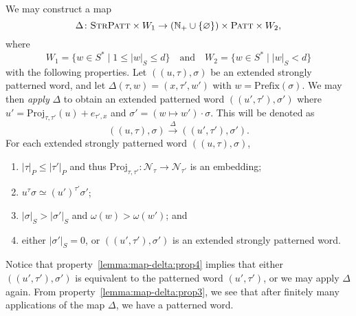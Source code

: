 \begin{lemma}\label{lemma:map-delta}
	We may construct a map
	\[
		\Delta \colon
		\textsc{StrPatt} \times W_1
		\to
		(\mathbb{N}_+ \cup \{\varnothing\}) \times \textsc{Patt} \times W_2,
	\]
	where
	\[
		W_1 = \{w \in S^* \mid 1 \leqslant |w|_S \leqslant d\}
		\quad\text{and}\quad
		W_2 = \{w \in S^* \mid |w|_S < d\}
	\]
	with the following properties.
	Let $((u,\tau),\sigma)$ be an extended strongly patterned word, and let $\Delta(\tau,w) = (x,\tau',w')$ with $w = \mathrm{Prefix}(\sigma)$.
	We may then \emph{apply} $\Delta$ to obtain an extended patterned word $((u',\tau'),\sigma')$ where $u' = \mathrm{Proj}_{\tau,\tau'}(u)+e_{\tau',x}$ and $\sigma' = (w\mapsto w') \cdot \sigma$.
	This will be denoted as
	\[
		((u,\tau),\sigma)
		\xrightarrow{\Delta}
		((u',\tau'),\sigma').
	\]
	For each extended strongly patterned word $((u,\tau),\sigma)$,
	\begin{enumerate}
		\item\label{lemma:map-delta:prop1}
			$|\tau|_P \leqslant |\tau'|_P$ and thus $\mathrm{Proj}_{\tau,\tau'}\colon\mathcal{N}_\tau \to \mathcal{N}_{\tau'}$ is an embedding;
		\item\label{lemma:map-delta:prop2}
			$u^\tau \sigma \simeq (u')^{\tau'}\sigma'$;
		\item\label{lemma:map-delta:prop3}
			$|\sigma|_S > |\sigma'|_S$ and $\omega(w) > \omega(w')$; and
		\item\label{lemma:map-delta:prop4}
			either $|\sigma'|_S = 0$, or $((u',\tau'),\sigma')$ is an extended strongly patterned word.
	\end{enumerate}
	Notice that property~\ref{lemma:map-delta:prop4} implies that either $((u',\tau'),\sigma')$ is equivalent to the patterned word $(u',\tau')$, or we may apply $\Delta$ again.
	From property~\ref{lemma:map-delta:prop3}, we see that after finitely many applications of the map $\Delta$, we have a patterned word.
\end{lemma}

